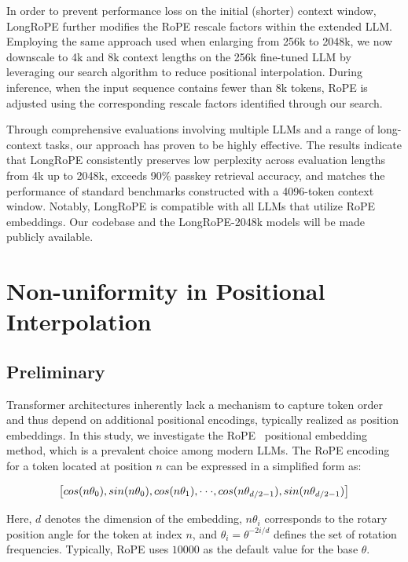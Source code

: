 In order to prevent performance loss on the initial (shorter) context window, {LongRoPE} further modifies the RoPE rescale factors within the extended LLM. Employing the same approach used when enlarging from 256k to 2048k, we now downscale to 4k and 8k context lengths on the 256k fine-tuned LLM by leveraging our search algorithm to reduce positional interpolation. During inference, when the input sequence contains fewer than 8k tokens, RoPE is adjusted using the corresponding rescale factors identified through our search.

Through comprehensive evaluations involving multiple LLMs and a range of long-context tasks, our approach has proven to be highly effective. The results indicate that LongRoPE consistently preserves low perplexity across evaluation lengths from 4k up to 2048k, exceeds 90\% passkey retrieval accuracy, and matches the performance of standard benchmarks constructed with a 4096-token context window. Notably, LongRoPE is compatible with all LLMs that utilize RoPE embeddings. Our codebase and the LongRoPE-2048k models will be made publicly available.

\section{Non-uniformity in Positional Interpolation}
\label{sec:analysis}

\subsection{Preliminary}

Transformer architectures inherently lack a mechanism to capture token order and thus depend on additional positional encodings, typically realized as position embeddings. In this study, we investigate the RoPE~\cite{rope} positional embedding method, which is a prevalent choice among modern LLMs. The RoPE encoding for a token located at position $n$ can be expressed in a simplified form as:

\begin{equation}
		\fontsize{7.8}{7.8} \selectfont
	\label{eq:rope}
	\left[ cos(n\theta_0), sin(n\theta_0), cos(n\theta_1), \cdot\cdot\cdot, cos(n\theta_{d/2-1}), sin(n\theta_{d/2-1}) \right]   
\end{equation}

Here, $d$ denotes the dimension of the embedding, $n\theta_i$ corresponds to the rotary position angle for the token at index $n$, and $\theta_i=\theta^{-2i/d}$ defines the set of rotation frequencies. Typically, RoPE uses $10000$ as the default value for the base $\theta$.


